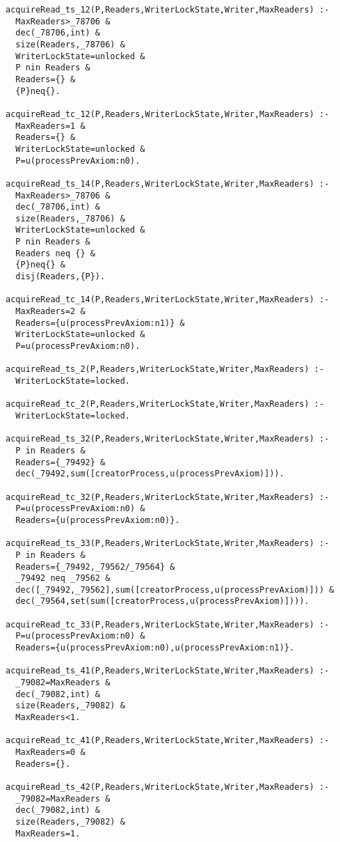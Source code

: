 \documentclass[a4paper, 12pt]{article}
\begin{document}
\begin{verbatim}
acquireRead_ts_12(P,Readers,WriterLockState,Writer,MaxReaders) :-
  MaxReaders>_78706 &
  dec(_78706,int) &
  size(Readers,_78706) &
  WriterLockState=unlocked &
  P nin Readers &
  Readers={} &
  {P}neq{}.

acquireRead_tc_12(P,Readers,WriterLockState,Writer,MaxReaders) :-
  MaxReaders=1 &
  Readers={} &
  WriterLockState=unlocked &
  P=u(processPrevAxiom:n0).

acquireRead_ts_14(P,Readers,WriterLockState,Writer,MaxReaders) :-
  MaxReaders>_78706 &
  dec(_78706,int) &
  size(Readers,_78706) &
  WriterLockState=unlocked &
  P nin Readers &
  Readers neq {} &
  {P}neq{} &
  disj(Readers,{P}).

acquireRead_tc_14(P,Readers,WriterLockState,Writer,MaxReaders) :-
  MaxReaders=2 &
  Readers={u(processPrevAxiom:n1)} &
  WriterLockState=unlocked &
  P=u(processPrevAxiom:n0).

acquireRead_ts_2(P,Readers,WriterLockState,Writer,MaxReaders) :-
  WriterLockState=locked.

acquireRead_tc_2(P,Readers,WriterLockState,Writer,MaxReaders) :-
  WriterLockState=locked.

acquireRead_ts_32(P,Readers,WriterLockState,Writer,MaxReaders) :-
  P in Readers &
  Readers={_79492} &
  dec(_79492,sum([creatorProcess,u(processPrevAxiom)])).

acquireRead_tc_32(P,Readers,WriterLockState,Writer,MaxReaders) :-
  P=u(processPrevAxiom:n0) &
  Readers={u(processPrevAxiom:n0)}.

acquireRead_ts_33(P,Readers,WriterLockState,Writer,MaxReaders) :-
  P in Readers &
  Readers={_79492,_79562/_79564} &
  _79492 neq _79562 &
  dec([_79492,_79562],sum([creatorProcess,u(processPrevAxiom)])) &
  dec(_79564,set(sum([creatorProcess,u(processPrevAxiom)]))).

acquireRead_tc_33(P,Readers,WriterLockState,Writer,MaxReaders) :-
  P=u(processPrevAxiom:n0) &
  Readers={u(processPrevAxiom:n0),u(processPrevAxiom:n1)}.

acquireRead_ts_41(P,Readers,WriterLockState,Writer,MaxReaders) :-
  _79082=MaxReaders &
  dec(_79082,int) &
  size(Readers,_79082) &
  MaxReaders<1.

acquireRead_tc_41(P,Readers,WriterLockState,Writer,MaxReaders) :-
  MaxReaders=0 &
  Readers={}.

acquireRead_ts_42(P,Readers,WriterLockState,Writer,MaxReaders) :-
  _79082=MaxReaders &
  dec(_79082,int) &
  size(Readers,_79082) &
  MaxReaders=1.


\end{verbatim}
\end{document}
